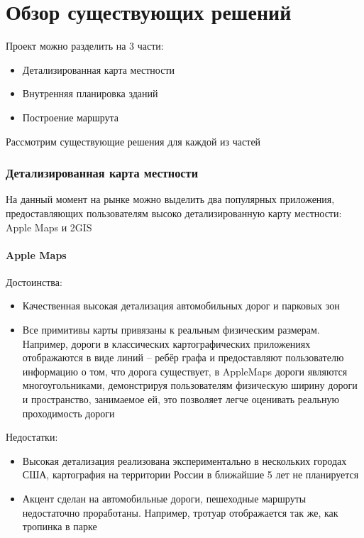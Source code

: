   \section{Обзор существующих решений}
    Проект можно разделить на 3 части:
    \begin{itemize}
      \item Детализированная карта местности
      \item Внутренняя планировка зданий
      \item Построение маршрута
    \end{itemize}


    Рассмотрим существующие решения для каждой из частей

    \subsubsection{Детализированная карта местности}
      На данный момент на рынке можно выделить два популярных приложения, предоставляющих пользователям высоко детализированную карту местности: Apple Maps и 2GIS
      \paragraph{Apple Maps}
        \noindent Достоинства:
        \begin{itemize}
          \item Качественная высокая детализация автомобильных дорог и парковых зон
          \item Все примитивы карты привязаны к реальным физическим размерам. Например, дороги в классических картографических приложениях отображаются в виде линий -- ребёр графа и предоставляют пользователю информацию о том, что дорога существует, в AppleMaps дороги являются многоугольниками, демонстрируя пользователям физическую ширину дороги и пространство, занимаемое ей, это позволяет легче оценивать реальную проходимость дороги
        \end{itemize}

        \noindent Недостатки:
        \begin{itemize}
          \item Высокая детализация реализована экспериментально в нескольких городах США, картография на территории России в ближайшие 5 лет не планируется
          \item Акцент сделан на автомобильные дороги, пешеходные маршруты недостаточно проработаны. Например, тротуар отображается так же, как тропинка в парке
        \end{itemize}


